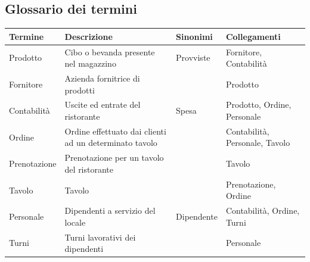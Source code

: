 \subsection{Glossario dei termini}
\begin{longtable}{p{2.5cm} p{5.5cm} p{2cm} p{4cm}}
    \toprule
    \textbf{Termine} & \textbf{Descrizione} & \textbf{Sinonimi} & \textbf{Collegamenti}\\ \midrule
    Prodotto & Cibo o bevanda presente nel magazzino & Provviste & Fornitore, Contabilità \\ \midrule
    Fornitore & Azienda fornitrice di prodotti & & Prodotto \\ \midrule
    Contabilità & Uscite ed entrate del ristorante & Spesa & Prodotto, Ordine, Personale \\ \midrule
    Ordine & Ordine effettuato dai clienti ad un determinato tavolo & & Contabilità, Personale, Tavolo \\ \midrule
    Prenotazione & Prenotazione per un tavolo del ristorante & & Tavolo \\ \midrule
    Tavolo & Tavolo & & Prenotazione, Ordine\\ \midrule
    Personale & Dipendenti a servizio del locale & Dipendente & Contabilità, Ordine, Turni\\ \midrule
    Turni & Turni lavorativi dei dipendenti & & Personale	\\ \midrule
\end{longtable}

